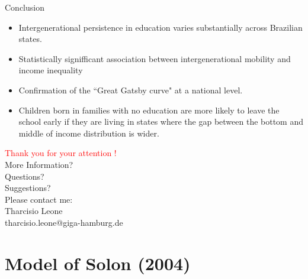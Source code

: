 \documentclass{beamer}
\begin{document}
\begin{frame} {Conclusion}
\begin{itemize}
\item Intergenerational persistence in education varies substantially across Brazilian states.
\vspace{0.5cm}
\item Statistically signifficant association between intergenerational mobility and income inequality %
\vspace{0.5cm}
\item Confirmation of the ``Great Gatsby curve" at a national level.
\vspace{0.5cm}
\item Children born in families with no education are more likely to leave the school early if they are living in states where the gap between the bottom and middle of income distribution is wider.
\end{itemize}
\end{frame}



\begin{frame}
\vspace{2cm}
\begin{center}
\Huge\textcolor{red}{Thank you for your attention !} \\

\large {More Information? \\ Questions? \\ Suggestions? \\}
\vspace{1cm}
Please contact me: \\
Tharcisio Leone \\
tharcisio.leone@giga-hamburg.de 
\end{center}
\end{frame}





\appendix
\section{Model of Solon (2004)} 
\end{document}
